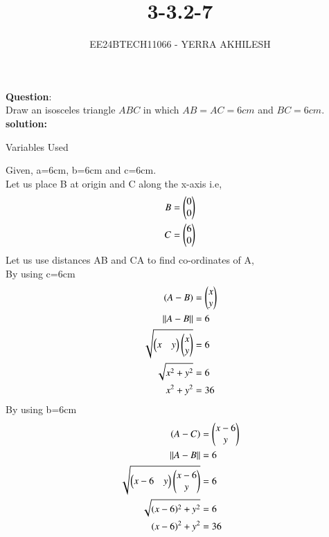 \documentclass[journal]{IEEEtran}
\begin{document}

\vspace{3cm}

\title{3-3.2-7}
\author{EE24BTECH11066 - YERRA AKHILESH
}
{\let\newpage\relax\maketitle}

\renewcommand{\thefigure}{\theenumi}
\renewcommand{\thetable}{\theenumi}
\setlength{\intextsep}{10pt} %


\renewcommand{\thetable}{\theenumi}
\textbf{Question}:\\
Draw an isosceles triangle $ABC$ in which $AB = AC = 6cm$ and $BC = 6cm.$
\\
\textbf{solution: }
\begin{table}[h!]    
  \centering
  
  \caption{Variables Used}
  \label{tab1-1.8-10}
\end{table}
Given, a=6cm, b=6cm and c=6cm.\\
Let us place B at origin and C along the x-axis i.e, 
\begin{align}
B &= \begin{pmatrix}0\\0\end{pmatrix} \\
C &= \begin{pmatrix}6\\0\end{pmatrix}
\end{align}
Let us use distances AB and CA to find co-ordinates of A,\\
By using c=6cm
\begin{align}
    (A-B)&=\begin{pmatrix}x\\y\end{pmatrix}\\
    \left\lVert A-B\right\rVert&=6\\
    \sqrt{\begin{pmatrix}x & y\end{pmatrix} \begin{pmatrix}x \\ y\end{pmatrix}}&=6\\
    \sqrt{x^2+y^2}&=6\\
    x^2+y^2&=36
\end{align}
By using b=6cm
\begin{align}
    (A-C)&=\begin{pmatrix}x-6\\y\end{pmatrix}\\
    \left\lVert A-B\right\rVert&=6\\
    \sqrt{\begin{pmatrix}x-6 & y\end{pmatrix} \begin{pmatrix}x-6 \\ y\end{pmatrix}}&=6\\
    \sqrt{(x-6)^2+y^2}&=6\\
    (x-6)^2+y^2&=36
\end{align}
\end{document}
